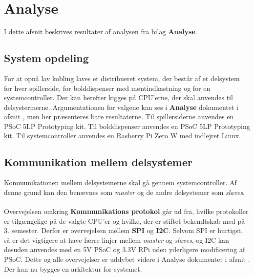 \documentclass[Rapport/Rapport_main.tex]{subfiles}
\begin{document}
\section{Analyse}\label{sec:rapport_analyse}
I dette afsnit beskrives resultater af analysen fra bilag \textbf{Analyse}.
\subsection{System opdeling}
For at opnå lav kobling laves et distribueret system, der består af et delsystem for hver spillerside, for bolddispenser med møntindkastning og for en systemcontroller.
Der kan herefter kigges på CPU'erne, der skal anvendes til delsystermerne. Argumentationen for valgene kan ses i \textbf{Analyse} dokumentet i afsnit , men her præsenteres bare resultaterne. Til spillersiderne anvendes en PSoC 5LP Prototyping kit\cite{psoc5lp}. Til bolddispenser anvendes en PSoC 5LP Prototyping kit\cite{psoc5lp}. Til systemcontroller anvendes en Rasberry Pi Zero W med indlejret Linux\cite{rpi_webpage}.

\subsection{Kommunikation mellem delsystemer}
Kommunikationen mellem delsystemerne skal gå gennem systemcontroller. Af denne grund kan den benævnes som \textit{master} og de andre delsystemer som \textit{slaves}.\\\\
Overvejelsen omkring \textbf{Kommunikations protokol} går ud fra, hvilke protokoller er tilgængelige på de valgte CPU'er og hvilke, der er stiftet bekendtskab med på 3. semester. Derfor er overvejelsen mellem \textbf{SPI} og \textbf{I2C}. Selvom SPI er hurtigst, så er det vigtigere at have færre linjer mellem \textit{master} og \textit{slaves}, og I2C kan desuden anvendes med en 5V PSoC og 3.3V RPi uden yderligere modificering af PSoC. Dette og alle overvejelser er uddybet videre i Analyse dokumentet i afsnit .\\

Der kan nu bygges en arkitektur for systemet.
\end{document}
